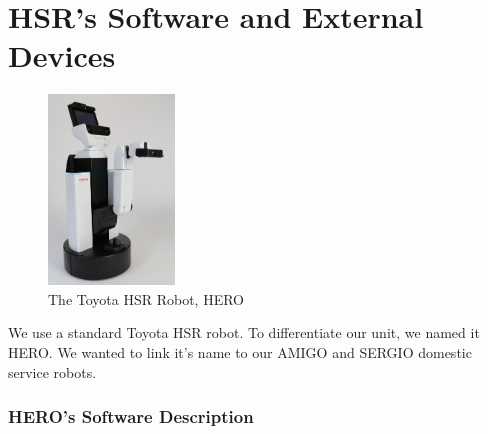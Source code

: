 \section{HSR's Software and External Devices}

\setlength\intextsep{0pt}
\begin{figure}
	\centering
	\includegraphics[width=0.3\textwidth]{Figures/Toyota_HSR}
	\caption{The Toyota\texttrademark\hspace{0em} HSR Robot, HERO}
	\label{fig:hsr}
\end{figure}

We use a standard Toyota\texttrademark\hspace{0em} HSR robot. 
To differentiate our unit, we named it HERO. 
We wanted to link it's name to our AMIGO and SERGIO domestic service robots.

\subsubsection{HERO's Software Description}

